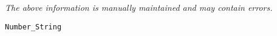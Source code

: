 \label{pkg:number\_string}

{\tiny \it The above information is manually maintained and may contain errors.}
\begin{verbatim}
Number_String
\end{verbatim}
